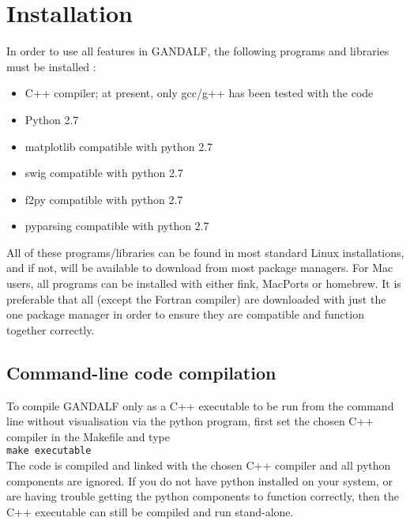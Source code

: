 \documentclass[a4paper]{article}
\newcommand{\var}[1]{\texttt{#1}}
\begin{document}
\section{Installation} \label{S:INSTALL}
In order to use all features in GANDALF, the following programs and libraries must be installed : 
\begin{itemize}
\item C++ compiler; at present, only gcc/g++ has been tested with the code
\item Python 2.7
\item matplotlib compatible with python 2.7
\item swig compatible with python 2.7
\item f2py compatible with python 2.7
\item pyparsing compatible with python 2.7
\end{itemize}


All of these programs/libraries can be found in most standard Linux installations, and if not, will be available to download from most package managers.  For Mac users, all programs can be installed with either fink, MacPorts or homebrew.  It is preferable that all (except the Fortran compiler) are downloaded with just the one package manager in order to ensure they are compatible and function together correctly.



\subsection{Command-line code compilation}

To compile GANDALF only as a C++ executable to be run from the command line without visualisation via the python program, first set the chosen C++ compiler in the Makefile and type \\
\newline
\noindent \var{make executable} \\

\noindent The code is compiled and linked with the chosen C++ compiler and all python components are ignored.  If you do not have python installed on your system, or are having trouble getting the python components to function correctly, then the C++ executable can still be compiled and run stand-alone.
\end{document}
